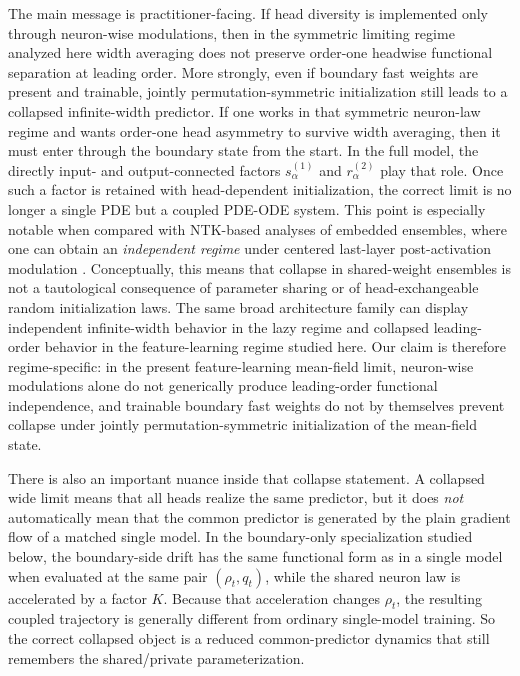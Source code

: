 \documentclass[11pt]{article}
\theoremstyle{definition}
\begin{document}
The main message is practitioner-facing. If head diversity is implemented only
through neuron-wise modulations, then in the symmetric limiting regime analyzed
here width averaging does not preserve order-one headwise functional separation
at leading order. More strongly, even if boundary fast weights are present and trainable,
jointly permutation-symmetric initialization still leads to a collapsed
infinite-width predictor. If one works in that symmetric neuron-law regime and
wants order-one head asymmetry to survive width averaging, then it must enter
through the boundary state from the start. In the full model, the directly input- and output-connected factors
$s_\alpha^{(1)}$ and $r_\alpha^{(2)}$ play that role. Once such a factor is
retained with head-dependent initialization, the correct limit is no longer a
single PDE but a coupled PDE-ODE system. This
point is especially notable when compared with NTK-based analyses of embedded
ensembles, where one can obtain an \emph{independent regime} under centered
last-layer post-activation modulation \cite{velikanov2022}. Conceptually, this
means that collapse in shared-weight ensembles is not a tautological
consequence of parameter sharing or of head-exchangeable random initialization
laws. The same broad architecture family can display independent infinite-width
behavior in the lazy regime and collapsed leading-order behavior in the
feature-learning regime studied here. Our claim is therefore regime-specific:
in the present feature-learning mean-field limit, neuron-wise modulations alone
do not generically produce leading-order functional independence, and trainable
boundary fast weights do not by themselves prevent collapse under jointly
permutation-symmetric initialization of the mean-field state.

There is also an important nuance inside that collapse statement. A collapsed
wide limit means that all heads realize the same predictor, but it does
\emph{not} automatically mean that the common predictor is generated by the
plain gradient flow of a matched single model. In the boundary-only
specialization studied below, the boundary-side drift has the same functional
form as in a single model when evaluated at the same pair $(\rho_t,q_t)$, while
the shared neuron law is accelerated by a factor $K$. Because that acceleration
changes $\rho_t$, the resulting coupled trajectory is generally different from
ordinary single-model training. So the correct collapsed object is a reduced
common-predictor dynamics that still remembers the shared/private
parameterization.
\end{document}
